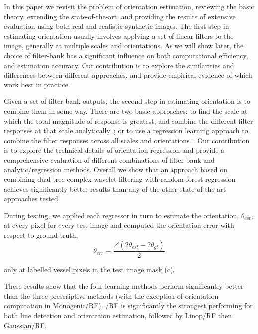 In this paper we revisit the problem of orientation estimation, reviewing the basic theory, extending the state-of-the-art, and providing the results of extensive evaluation using both real and realistic synthetic images. The first step in estimating orientation usually involves applying a set of linear filters to the image, generally at multiple scales and orientations. As we will show later, the choice of filter-bank has a significant influence on both computational efficiency, and estimation accuracy. Our contribution is to explore the similarities and differences between different approaches, and provide empirical evidence of which work best in practice.

Given a set of filter-bank outputs, the second step in estimating orientation is to combine them in some way. There are two basic approaches: to find the scale at which the total magnitude of response is greatest, and combine the different filter responses at that scale analytically~\cite{Karssemeijer_teBrake_TMI96,Mei_etal_IVC09}; or to use a regression learning approach to combine the filter responses across all scales and orientations~\cite{Berks_etal_IPMI11}. Our contribution is to explore the technical details of orientation regression and provide a comprehensive evaluation of different combinations of filter-bank and analytic/regression methods. Overall we show that an approach based on combining dual-tree complex wavelet filtering with random forest regression achieves significantly better results than any of the other state-of-the-art approaches tested.

During testing, we applied each regressor in turn to estimate the orientation, $\theta_{est}$, at every pixel for every test image and computed the orientation error with respect to ground truth,
%
\begin{equation}
	\theta_{err} = \frac{\angle(2\theta_{est}-2\theta_{gt})}{2}
\end{equation}

\noindent only at labelled vessel pixels in the test image mask (c).

These results show that the four learning methods perform significantly better than the three prescriptive methods (with the exception of orientation computation in Monogenic/RF). \dtcwt/RF is significantly the strongest performing for both line detection and orientation estimation, followed by Linop/RF then Gaussian/RF.

